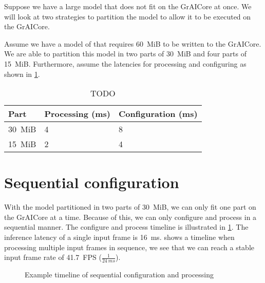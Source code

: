 Suppose we have a large model that does not fit on the GrAICore at once.
We will look at two strategies to partition the model to allow it to be executed on the GrAICore.

Assume we have a model of that requires \SI{60}{MiB} to be written to the GrAICore.
We are able to partition this model in two parts of \SI{30}{MiB} and four parts of \SI{15}{MiB}.
Furthermore, assume the latencies for processing and configuring as shown in \cref{tab:partitiong_strategies_example}.

\begin{table}[hbtp]
\centering
\begin{tabular}{@{}lll@{}}
\toprule
\textbf{Part} & \textbf{Processing (ms)} & \textbf{Configuration (ms)} \\ \midrule
\SI{30}{MiB}  & 4                        & 8                           \\
\SI{15}{MiB}  & 2                        & 4                          
\end{tabular}
\caption{TODO}
\label{tab:partitiong_strategies_example}
\end{table}

\section{Sequential configuration}
With the model partitioned in two parts of \SI{30}{MiB}, we can only fit one part on the GrAICore at a time.
Because of this, we can only configure and process in a sequential manner.
The configure and process timeline is illustrated in \cref{fig:schedule_sequential_configuration}.
The inference latency of a single input frame is \SI{16}{ms}.
 shows a timeline when processing multiple input frames in sequence, we see that we can reach a stable input frame rate of \SI{41.7}{FPS} ($\frac{1}{\SI{24}{ms}}$).

\begin{figure}[hbtp]
    \centering
    \resizebox{0.6\linewidth}{!}{
        
    }
    \caption{Example timeline of sequential configuration and processing}
    \label{fig:schedule_sequential_configuration}
\end{figure}

